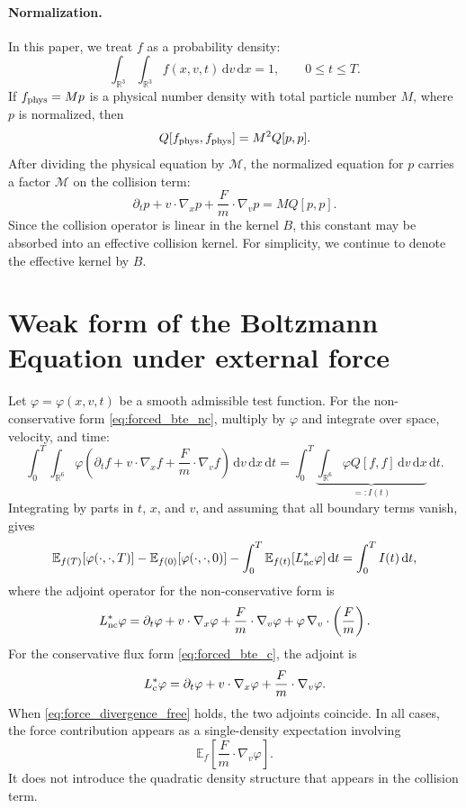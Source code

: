 \documentclass[11pt]{article}
\newcommand{\R}{\mathbb{R}}
\newcommand{\dd}{\,\mathrm{d}}
\newcommand{\E}{\mathbb{E}}
\newcommand{\ph}{\varphi}
\theoremstyle{plain}
\begin{document}
\paragraph{Normalization.}
In this paper, we treat $f$ as a probability density:
\begin{equation}
\int_{\R^3}\int_{\R^3} f(x,v,t)\dd v\dd x=1,
\qquad 0\le t\le T.
\label{eq:normalization}
\end{equation}
If $f_{\rm phys}=  M p$ is a physical number density with total particle number $  M$, where $p$ is normalized, then
\[
Q[f_{\rm phys},f_{\rm phys}]=  M^2 Q[p,p].
\]
After dividing the physical equation by $\mathcal M$, the normalized equation for $p$ carries a factor $\mathcal M$ on the collision term:
\[
\partial_t p+v\cdot\nabla_x p+\frac{F}{m}\cdot\nabla_v p
=
  M Q[p,p].
\]
Since the collision operator is linear in the kernel $B$, this constant may be absorbed into an effective collision kernel. For simplicity, we continue to denote the effective kernel by $B$.

\section{Weak form of the Boltzmann Equation under external force}
\label{sec:weakform}
Let $\ph=\ph(x,v,t)$ be a smooth admissible test function. For the non-conservative form \eqref{eq:forced_bte_nc}, multiply by $\ph$ and integrate over space, velocity, and time:
\begin{equation}
\int_0^T\int_{\R^6}
\ph\left(\partial_t f+v\cdot\nabla_x f+\frac{F}{m}\cdot\nabla_v f\right)
\dd v\dd x\dd t
=
\int_0^T
\underbrace{\int_{\R^6}\ph Q[f,f]\dd v\dd x}_{=:I(t)}
\dd t.
\label{eq:weak_multiply}
\end{equation}
Integrating by parts in $t$, $x$, and $v$, and assuming that all boundary terms vanish, gives
\begin{equation}
\E_{f(T)}[\ph(\cdot,\cdot,T)]
-
\E_{f(0)}[\ph(\cdot,\cdot,0)]
-
\int_0^T \E_{f(t)}[L^*_{\rm nc}\ph]\dd t
=
\int_0^T I(t)\dd t,
\label{eq:weak_identity_nc}
\end{equation}
where the adjoint operator for the non-conservative form is
\begin{equation}
L^*_{\rm nc}\ph
=
\partial_t\ph+v\cdot\nabla_x\ph+\frac{F}{m}\cdot\nabla_v\ph
+\ph\,\nabla_v\cdot\left(\frac{F}{m}\right).
\label{eq:adjoint_nc}
\end{equation}
For the conservative flux form \eqref{eq:forced_bte_c}, the adjoint is
\begin{equation}
L^*_{\rm c}\ph
=
\partial_t\ph+v\cdot\nabla_x\ph+\frac{F}{m}\cdot\nabla_v\ph.
\label{eq:adjoint_c}
\end{equation}
When \eqref{eq:force_divergence_free} holds, the two adjoints coincide. In all cases, the force contribution appears as a single-density expectation involving
\[
\E_f\left[\frac{F}{m}\cdot\nabla_v\ph\right].
\]
It does not introduce the quadratic density structure that appears in the collision term.
\end{document}
